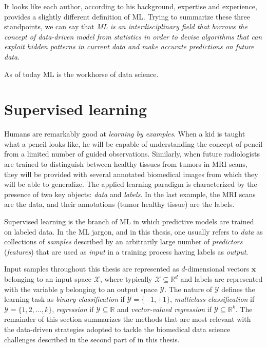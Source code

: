 It looks like each author, according to his background, expertise and experience, provides a slightly different definition of ML. Trying to summarize these three standpoints, we can say that \emph{ML is an interdisciplinary field that borrows the concept of data-driven model from statistics in order to devise algorithms that can exploit hidden patterns in current data and make accurate predictions on future data}.

As of today ML is the workhorse of data science.


  \section{Supervised learning} \label{subsec:supervised_learning}

	  Humans are remarkably good at \emph{learning by examples}. When a kid is taught what a pencil looks like, he will be capable of understanding the concept of pencil from a limited number of guided observations. Similarly, when future radiologists are trained to distinguish between healthy tissues from tumors in MRI scans, they will be provided with several annotated biomedical images from which they will be able to generalize.
	  The applied learning paradigm is characterized by the presence of two key objects: \textit{data} and \textit{labels}. In the last example, the MRI scans are the data, and their annotations (\eg tumor \vs healthy tissue) are the labels.

	  Supervised learning is the branch of ML in which predictive models are trained on labeled data. In the ML jargon, and in this thesis, one usually refers to \textit{data} as collections of \textit{samples} described by an arbitrarily large number of \textit{predictors} (\textit{features}) that are used as \textit{input} in a training process having labels as \textit{output}.

	  Input samples throughout this thesis are represented as $d$-dimensional vectors $\bm{x}$ belonging to an input space $\mathcal{X}$, where typically $\mathcal{X}\subseteq\mathbb{R}^d$ and labels are represented with the variable $y$ belonging to an output space $\mathcal{Y}$.
	  The nature of $\mathcal{Y}$ defines the learning task as \textit{binary classification} if  $\mathcal{Y} = \{-1,+1\}$, \textit{multiclass classification} if $\mathcal{Y} = \{1,2,\dots,k\}$,
	  \textit{regression} if $\mathcal{Y}\subseteq\mathds{R}$ and
	  \textit{vector-valued regression} if $\mathcal{Y}\subseteq\mathds{R}^k$.
	  The remainder of this section summarizes the methods that are most relevant with the data-driven strategies adopted to tackle the biomedical data science challenges described in the second part of in this thesis.

